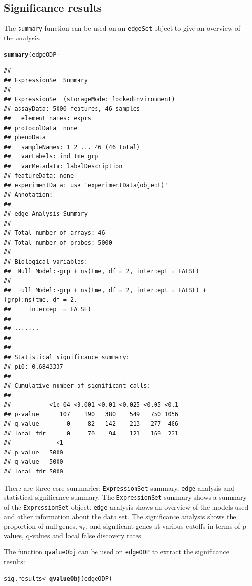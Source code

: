 \documentclass{article}\usepackage[]{graphicx}\usepackage[]{color}
\makeatletter
\newcommand{\hlstd}[1]{\textcolor[rgb]{0.345,0.345,0.345}{#1}}%
\newcommand{\hlkwb}[1]{\textcolor[rgb]{0.69,0.353,0.396}{#1}}%
\newcommand{\hlkwd}[1]{\textcolor[rgb]{0.737,0.353,0.396}{\textbf{#1}}}%
\newenvironment{kframe}{%
 \def\at@end@of@kframe{}%
 \ifinner\ifhmode%
  \def\at@end@of@kframe{\end{minipage}}%
  \begin{minipage}{\columnwidth}%
 \fi\fi%
 \def\FrameCommand##1{\hskip\@totalleftmargin \hskip-\fboxsep
 \colorbox{shadecolor}{##1}\hskip-\fboxsep
     \hskip-\linewidth \hskip-\@totalleftmargin \hskip\columnwidth}%
 \MakeFramed {\advance\hsize-\width
   \@totalleftmargin\z@ \linewidth\hsize
   \@setminipage}}%
 {\par\unskip\endMakeFramed%
 \at@end@of@kframe}
\newenvironment{knitrout}{}{} %
\makeatother
\begin{document}
\subsection{Significance results}
The {\tt summary} function can be used on an {\tt edgeSet} object to give an overview of the analysis:

\begin{knitrout}
\color{fgcolor}\begin{kframe}
\begin{alltt}
\hlkwd{summary}\hlstd{(edgeODP)}
\end{alltt}
\begin{verbatim}
## 
## ExpressionSet Summary 
##  
## ExpressionSet (storageMode: lockedEnvironment)
## assayData: 5000 features, 46 samples 
##   element names: exprs 
## protocolData: none
## phenoData
##   sampleNames: 1 2 ... 46 (46 total)
##   varLabels: ind tme grp
##   varMetadata: labelDescription
## featureData: none
## experimentData: use 'experimentData(object)'
## Annotation:  
## 
## edge Analysis Summary 
##  
## Total number of arrays: 46 
## Total number of probes: 5000 
##  
## Biological variables: 
## 	Null Model:~grp + ns(tme, df = 2, intercept = FALSE)
## 
## 	Full Model:~grp + ns(tme, df = 2, intercept = FALSE) + (grp):ns(tme, df = 2, 
##     intercept = FALSE)
## 
## ....... 
##  
## 
## Statistical significance summary:
## pi0:	0.6843337	
## 
## Cumulative number of significant calls:
## 
##           <1e-04 <0.001 <0.01 <0.025 <0.05 <0.1
## p-value      107    190   380    549   750 1056
## q-value        0     82   142    213   277  406
## local fdr      0     70    94    121   169  221
##             <1
## p-value   5000
## q-value   5000
## local fdr 5000
\end{verbatim}
\end{kframe}
\end{knitrout}
There are three core summaries: {\tt ExpressionSet} summary, {\tt edge} analysis and statistical significance summary. The {\tt ExpressionSet} summary shows a summary of the {\tt ExpressionSet} object. {\tt edge} analysis shows an overview of the models used and other information about the data set. The significance analysis shows the proportion of null genes, $\pi_{0}$, and significant genes at various cutoffs in terms of p-values, q-values and local false discovery rates.

The function {\tt qvalueObj} can be used on {\tt edgeODP} to extract the significance results:
\begin{knitrout}
\color{fgcolor}\begin{kframe}
\begin{alltt}
\hlstd{sig.results} \hlkwb{<-} \hlkwd{qvalueObj}\hlstd{(edgeODP)}
\end{alltt}
\end{kframe}
\end{knitrout}
\end{document}
